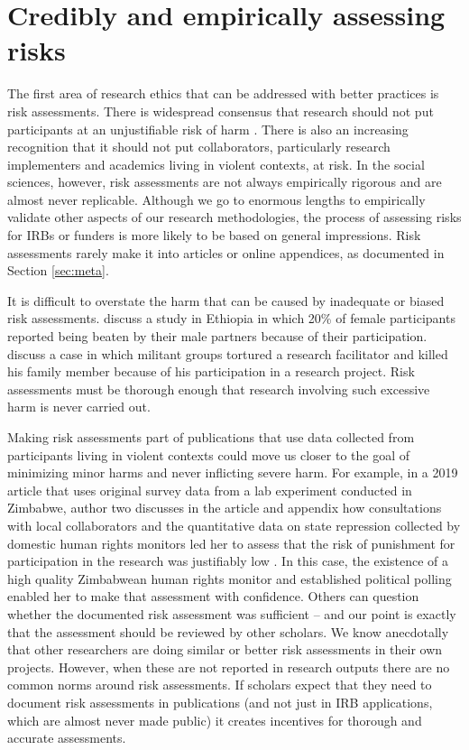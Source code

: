 


\section{Credibly and empirically assessing risks}

The first area of research ethics that can be addressed with better practices is risk assessments. There is widespread consensus that research should not put participants at an unjustifiable risk of harm \citep{apsa2020ethics}. There is also an increasing recognition that it should not put collaborators, particularly research implementers and academics living in violent contexts, at risk. In the social sciences, however, risk assessments are not always empirically rigorous and are almost never replicable. Although we go to enormous lengths to empirically validate other aspects of our research methodologies, the process of assessing risks for IRBs or funders is more likely to be based on general impressions. Risk assessments rarely make it into articles or online appendices, as documented in Section \ref{sec:meta}. 

It is difficult to overstate the harm that can be caused by inadequate or biased risk assessments. \citet{eck2020time} discuss a study in Ethiopia in which 20\% of female participants reported being beaten by their male partners because of their participation. \citet{baaz2019exploring} discuss a case in which militant groups tortured a research facilitator and killed his family member because of his participation in a research project. Risk assessments must be thorough enough that research involving such excessive harm is never carried out.  

Making risk assessments part of publications that use data collected from participants living in violent contexts could move us closer to the goal of minimizing minor harms  and never inflicting severe harm. For example, in a 2019 article that uses original survey data from a lab experiment conducted in Zimbabwe, author two discusses in the article and appendix how consultations with local collaborators and the quantitative data on state repression collected by domestic human rights monitors led her to assess that the risk of punishment for participation in the research was justifiably low \citep{young2019psychology}. In this case, the existence of a high quality Zimbabwean human rights monitor and established political polling enabled her to make that assessment with confidence. Others can question whether the documented risk assessment was sufficient -- and our point is exactly that the assessment should be reviewed by other scholars. We know anecdotally that other researchers are doing similar or better risk assessments in their own projects. However, when these are not reported in research outputs there are no common norms around risk assessments. If scholars expect that they need to document risk assessments in publications (and not just in IRB applications, which are almost never made public) it creates incentives for thorough and accurate assessments. 

